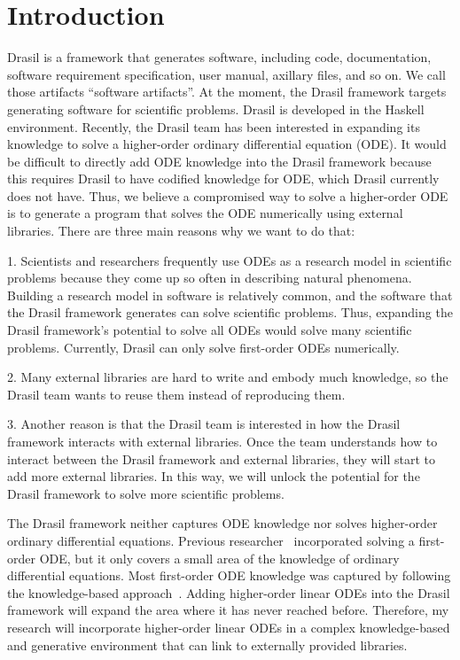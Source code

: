 \chapter{Introduction}
Drasil is a framework that generates software, including code, documentation, software requirement specification, user manual, axillary files, and so on. We call those artifacts ``software artifacts''. At the moment, the Drasil framework targets generating software for scientific problems. Drasil is developed in the Haskell environment. Recently, the Drasil team has been interested in expanding its knowledge to solve a higher-order ordinary differential equation (ODE). It would be difficult to directly add ODE knowledge into the Drasil framework because this requires Drasil to have codified knowledge for ODE, which Drasil currently does not have. Thus, we believe a compromised way to solve a higher-order ODE is to generate a program that solves the ODE numerically using external libraries. There are three main reasons why we want to do that:

1. Scientists and researchers frequently use ODEs as a research model in scientific problems because they come up so often in describing natural phenomena. Building a research model in software is relatively common, and the software that the Drasil framework generates can solve scientific problems. Thus, expanding the Drasil framework's potential to solve all ODEs would solve many scientific problems. Currently, Drasil can only solve first-order ODEs numerically.

2. Many external libraries are hard to write and embody much knowledge, so the Drasil team wants to reuse them instead of reproducing them.

3. Another reason is that the Drasil team is interested in how the Drasil framework interacts with external libraries. Once the team understands how to interact between the Drasil framework and external libraries, they will start to add more external libraries. In this way, we will unlock the potential for the Drasil framework to solve more scientific problems. 

The Drasil framework neither captures ODE knowledge nor solves higher-order ordinary differential equations. Previous researcher~\citep{brooks} incorporated solving a first-order ODE, but it only covers a small area of the knowledge of ordinary differential equations. Most first-order ODE knowledge was captured by following the knowledge-based approach~\citep{szymczaketal2016}. Adding higher-order linear ODEs into the Drasil framework will expand the area where it has never reached before. Therefore, my research will incorporate higher-order linear ODEs in a complex knowledge-based and generative environment that can link to externally provided libraries.

